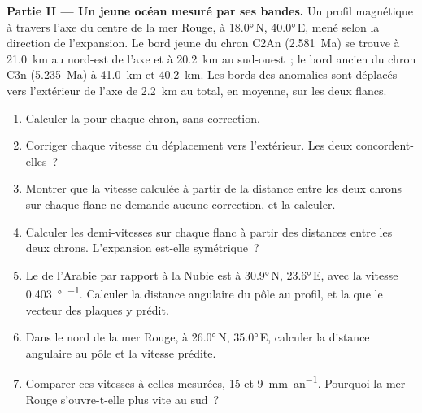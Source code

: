 \begin{problem}
\medskip
\noindent\textbf{Partie II --- Un jeune océan mesuré par ses bandes.} Un
profil magnétique à travers l'axe du centre de la mer Rouge, à
\ang{18.0}\,N, \ang{40.0}\,E, mené selon la direction de l'expansion. Le bord
jeune du chron C2An (\qty{2.581}{Ma}) se trouve à \qty{21.0}{km} au nord-est de
l'axe et à \qty{20.2}{km} au sud-ouest~; le bord ancien du chron C3n
(\qty{5.235}{Ma}) à \qty{41.0}{km} et \qty{40.2}{km}. Les bords des
anomalies sont déplacés vers l'extérieur de l'axe de \qty{2.2}{km} au total, en
moyenne, sur les deux flancs.
\begin{enumerate}[resume]
  \item Calculer la  pour chaque chron, sans correction.
  \item Corriger chaque vitesse du déplacement vers l'extérieur. Les deux concordent-elles~?
  \item Montrer que la vitesse calculée à partir de la distance entre les deux chrons sur
        chaque flanc ne demande aucune correction, et la calculer.
  \item Calculer les demi-vitesses sur chaque flanc à partir des distances entre les deux
        chrons. L'expansion est-elle symétrique~?
  \item Le  de l'Arabie par rapport à la Nubie est à \ang{30.9}\,N,
        \ang{23.6}\,E, avec la vitesse \qty{0.403}{\degree\per\Ma}. Calculer la
        distance angulaire du pôle au profil, et la  que
        le vecteur des plaques y prédit.
  \item Dans le nord de la mer Rouge, à \ang{26.0}\,N, \ang{35.0}\,E, calculer la
        distance angulaire au pôle et la vitesse prédite.
  \item Comparer ces vitesses à celles mesurées, 15 et
        \qty{9}{mm.an^{-1}}. Pourquoi la mer Rouge s'ouvre-t-elle plus vite au sud~?
\end{enumerate}


\end{problem}
